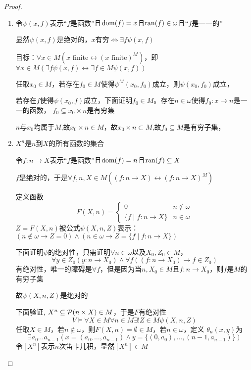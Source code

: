 \documentclass[11pt]{article}
\begin{document}
\begin{proof}
\begin{enumerate}
\item 令\(\psi(x,f)\)表示“\(f\)是函数”且\(\operatorname{dom}(f)=x\)且\(\operatorname{ran}(f)\in\omega\)且``\(f\)是一一的''

显然\(\psi(x,f)\)是绝对的，\(x\)有穷\(\Leftrightarrow \exists f\psi(x,f)\)

目标：\(\forall x\in M(x\text{ finite}\leftrightarrow(x\text{ finite})^M)\)，即
\(\forall x\in M(\exists f\psi(x,f)\leftrightarrow\exists f\in M\psi(x,f))\)

任取\(x_0\in M\)，若存在\(f_0\in M\)使得\(\psi^M(x_0,f_0)\)成立，则\(\psi(x_0,f_0)\)成立，

若存在\(f\)使得\(\psi(x_0,f)\)成立，下面证明\(f_0\in M\)。存在\(n\in\omega\)使得\(f_0:x\to n\)是一一的函数，
\(f_0\subseteq x_0\times n\)是有穷集

\(n\)与\(x_0\)均属于\(M\),故\(x_0\times n\in M\)，故\(x_0\times n\subset M\),故\(f_0\subseteq M\)是有穷子集，

\item \(X^n\)是\(n\)到\(X\)的所有函数的集合

令\(f:n\to X\)表示“\(f\)是函数”且\(\operatorname{dom}(f)=n\)且\(\operatorname{ran}(f)\subseteq X\)

\(f\)是绝对的，于是\(\forall f,n,X\in M((f:n\to X)\leftrightarrow(f:n\to X)^M)\)

定义函数
\begin{equation*}
F(X,n)=
\begin{cases}
0&n\notin\omega\\
\{f\mid f:n\to X\}&n\in\omega
\end{cases}
\end{equation*}
\(Z=F(X,n)\)被公式\(\psi(X,n,Z)\)表示：\((n\notin\omega\to Z=0)\wedge(n\in\omega\to Z=\{f\mid f:n\to X\})\)

下面证明\(\psi\)的绝对性，只需证明\(\forall n\in\omega\)以及\(X_0,Z_0\in M\)，
\begin{equation*}
\forall y\in Z_0(y:n\to X_0)\wedge\forall f((f:n\to X_0)\to f\in Z_0)
\end{equation*}
有绝对性，唯一的障碍是\(\forall f\)，但是因为当\(n,X_0\in M\)且\(f:n\to X_0\)，则\(f\)是\(M\)的有穷子集

故\(\psi(X,n,Z)\)是绝对的

下面验证, \(X^n\subseteq\mathcal{P}(n\times X)\in M\)，于是\(F\)有绝对性
\begin{equation*}
V\vDash\forall X\in M\forall n\in M\exists!Z\in M\psi(X,n,Z)
\end{equation*}
任取\(X\in M\)，若\(n\notin\omega\)，则\(F(X,n)=\emptyset\in M\)，若\(n\in\omega\)，定义
\(\theta_n(x,y)\)为
\begin{equation*}
\exists a_0\dots a_{n-1}(x=(a_0,\dots,a_{n-1})\wedge y=\{(0,a_0),\dots,(n-1,a_{n-1})\})
\end{equation*}
令\([X^n]\)表示\(n\)次笛卡儿积，显然\([X^n]\in M\)


\end{enumerate}
\end{proof}
\end{document}
